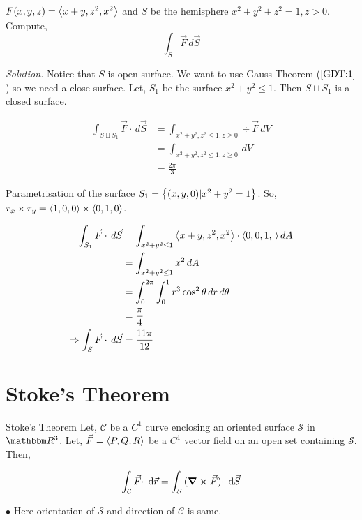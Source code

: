 \documentclass[../Analysis-3]{subfiles}
\begin{document}
\begin{Eg}{}{}
    $F (x,y,z) = \left\langle {x+y}, {z^2,x^2} \right\rangle$ and $S$ be the hemisphere $x^2+y^2+z^2 = 1 , z>0$. Compute,
    \[\int_{S} \vec{F} \,d \vec{S}\]

    \textit{Solution.} Notice that $S$ is open surface. We want to  use Gauss Theorem ($\ref{GDT:1}$) so we need a close surface. Let, $S_1$ be the surface $x^2 +y^2 \le 1$. Then $S \sqcup S_1$ is a closed surface.

    \begin{align*}
        \int_{S \sqcup S_1} \vec{F}\cdot \,d \vec{S} & = \int_{x^2+y^2,z^2 \le 1 , z \ge 0} \div \vec{F} \,dV \\
                                                     & = \int_{x^2+y^2,z^2 \le 1 , z \ge 0}\,dV               \\
                                                     & = \frac{2\pi}{3}
    \end{align*}

    Parametrisation of the surface $S_1 =\qty{(x,y,0) | x^2+y^2 = 1}$. So, $r_x \times r_y = \left\langle {1,0}, {0} \right\rangle \times \left\langle {0,1}, {0} \right\rangle$.

    \begin{align*}
        \int_{S_1} \vec{F} \cdot \,d \vec{S}           & = \int_{x^2+y^2 \le 1} \left\langle {x+y}, {z^2,x^2} \right\rangle \cdot \left\langle {0,0,1}, {\,} \right\rangle dA \\
                                                       & = \int_{x^2+y^2 \le 1} x^2 \,dA                                  \\
                                                       & = \int_{0}^{2\pi} \int_{0}^{1} r^3 \cos^2 \theta \,dr \,d\theta  \\
                                                       & = \frac{\pi}{4}                                                  \\
        \Rightarrow \int_{S} \vec{F} \cdot \,d \vec{S} & = \frac{11\pi}{12}
    \end{align*}
\end{Eg}

\section{Stoke's Theorem}
\begin{Thm}{Stoke's Theorem}{}\label{ST}
    Let, $\mathcal{C}$ be a $C^1$ curve enclosing an oriented surface $\mathcal{S}$ in $\R^3$. Let,  $\vec{F} = \left\langle {P,Q}, {R} \right\rangle$ be a $C^1$ vector field on an open set containing $\mathcal{S}$. Then,

    \small \[\int_{\mathcal{C}} {\vec{F} \cdot } \hspace{0.1cm} \dd {\vec{r}} = \int_{\mathcal{S}} {(\curl \vec{F}) \cdot} \hspace{0.1cm} \dd {\vec{S}}  \]

    $\bullet$ Here orientation of $\mathcal{S}$ and direction of $\mathcal{C}$ is same.
\end{Thm}
\end{document}
